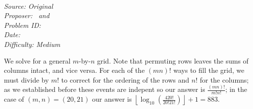 \SSbreak\\
\emph{Source: Original}\\
\emph{Proposer: \Ptan\, and \Pwen}\\
\emph{Problem ID:}\\
\emph{Date: }\\
\emph{Difficulty: Medium}\\
\SSbreak

\bigskip

\begin{solution}\hfil\medskip
  
    We solve for a general $m$-by-$n$ grid. Note that permuting rows leaves the sums of columns intact, and vice versa. For each of the $(mn)!$ 
    ways to fill the grid, we must divide by $m!$ to correct for the ordering of the rows and $n!$ for the columns; as we established before
    these events are indepent so our answer is $\frac{(mn)!}{m!n!}$; in the case of $(m, n) = (20, 21)$ our answer is 
    $\left\lfloor\log_{10}\left(\frac{420!}{20!21!}\right) \right\rfloor + 1 = \boxed{883}.$
\end{solution}\bigskip
